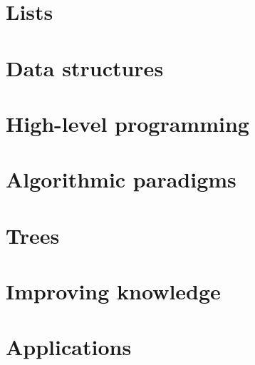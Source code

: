 \documentclass[oneside]{book}
\begin{document}
\part{Lists}





\part{Data structures}



\part{High-level programming}



\part{Algorithmic paradigms}





\part{Trees}




\part{Improving knowledge}



\part{Applications}



\end{document}
